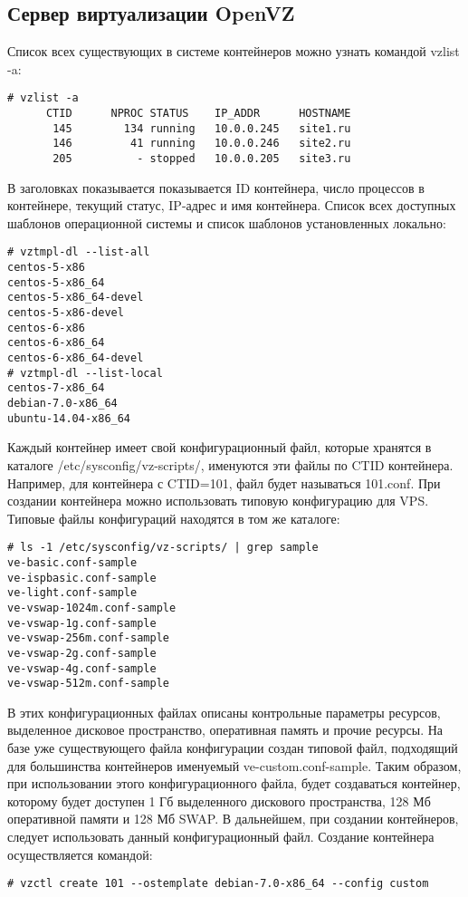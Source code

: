 \subsection{Сервер виртуализации OpenVZ}
Список всех существующих в системе контейнеров можно узнать командой vzlist -a:
\begin{lstlisting}
# vzlist -a
      CTID      NPROC STATUS    IP_ADDR      HOSTNAME
       145        134 running   10.0.0.245   site1.ru
       146         41 running   10.0.0.246   site2.ru
       205          - stopped   10.0.0.205   site3.ru
\end{lstlisting}
В заголовках показывается показывается ID контейнера, число процессов в контейнере, текущий статус, IP-адрес и имя контейнера.
Список всех доступных шаблонов операционной системы и список шаблонов установленных локально:
\begin{lstlisting}
# vztmpl-dl --list-all
centos-5-x86
centos-5-x86_64
centos-5-x86_64-devel
centos-5-x86-devel
centos-6-x86
centos-6-x86_64
centos-6-x86_64-devel
# vztmpl-dl --list-local
centos-7-x86_64
debian-7.0-x86_64
ubuntu-14.04-x86_64
\end{lstlisting}
Каждый контейнер имеет свой конфигурационный файл, которые хранятся в каталоге /etc/sysconfig/vz-scripts/, именуются эти файлы по CTID контейнера.
Например, для контейнера с CTID=101, файл будет называться 101.conf.
При создании контейнера можно использовать типовую конфигурацию для VPS.
Типовые файлы конфигураций находятся в том же каталоге:
\begin{lstlisting}
# ls -1 /etc/sysconfig/vz-scripts/ | grep sample
ve-basic.conf-sample
ve-ispbasic.conf-sample
ve-light.conf-sample
ve-vswap-1024m.conf-sample
ve-vswap-1g.conf-sample
ve-vswap-256m.conf-sample
ve-vswap-2g.conf-sample
ve-vswap-4g.conf-sample
ve-vswap-512m.conf-sample
\end{lstlisting}
В этих конфигурационных файлах описаны контрольные параметры ресурсов, выделенное дисковое пространство, оперативная память и прочие ресурсы.
На базе уже существующего файла конфигурации создан типовой файл, подходящий для большинства контейнеров именуемый ve-custom.conf-sample.
Таким образом, при использовании этого конфигурационного файла, будет создаваться контейнер, которому будет доступен 1 Гб выделенного дискового пространства, 128 Мб оперативной памяти и 128 Мб SWAP.
В дальнейшем, при создании контейнеров, следует использовать данный конфигурационный файл.
Создание контейнера осуществляется командой:
\begin{lstlisting}
# vzctl create 101 --ostemplate debian-7.0-x86_64 --config custom
\end{lstlisting}
